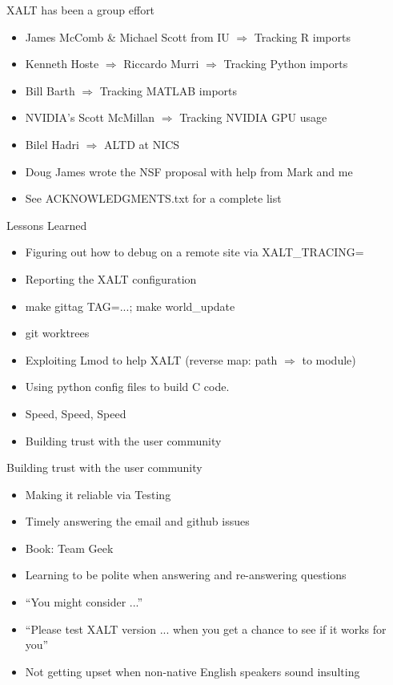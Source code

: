 \documentclass{beamer}
\begin{document}
\begin{frame}{XALT has been a group effort}
  \begin{itemize}
    \item James McComb \& Michael Scott from IU $\Rightarrow$ Tracking R imports
    \item Kenneth Hoste $\Rightarrow$ Riccardo Murri $\Rightarrow$
      Tracking Python imports
    \item Bill Barth $\Rightarrow$ Tracking MATLAB imports
    \item NVIDIA's Scott McMillan $\Rightarrow$ Tracking NVIDIA GPU
      usage
    \item Bilel Hadri $\Rightarrow$ ALTD at NICS
    \item Doug James wrote the NSF proposal with help from Mark and me
    \item See ACKNOWLEDGMENTS.txt for a complete list
  \end{itemize}
\end{frame}

\begin{frame}{Lessons Learned}
  \begin{itemize}
    \item Figuring out how to debug on a remote site via XALT\_TRACING=  
    \item Reporting the XALT configuration
    \item make gittag TAG=...; make world\_update
    \item git worktrees
    \item Exploiting Lmod to help XALT (reverse map: path
      $\Rightarrow$ to module)
    \item Using python config files to build C code.
    \item Speed, Speed, Speed
    \item Building trust with the user community
  \end{itemize}
\end{frame}

\begin{frame}{Building trust with the user community}
  \begin{itemize}
    \item Making it reliable via Testing
    \item Timely answering the email and github issues 
    \item Book: Team Geek
    \item Learning to be polite when answering and re-answering
      questions
    \item ``You might consider ...''
    \item ``Please test XALT version ... when you get a chance to see
      if it works for you''
    \item Not getting upset when non-native English speakers sound
      insulting
  \end{itemize}
\end{frame}
\end{document}
